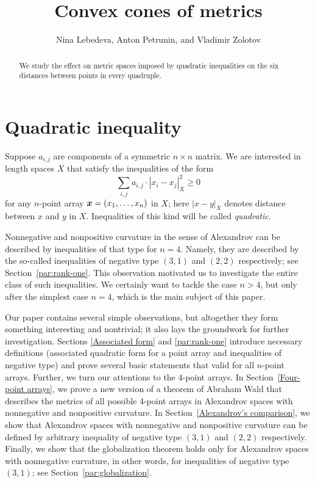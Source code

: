 \documentclass[a4paper,10pt]{article}
\def\thetitle{Convex cones of metrics}
\def\theauthors{Nina Lebedeva, Anton Petrunin, and Vladimir Zolotov}
\begin{document}


\title{\thetitle}
\author{\theauthors}
\date{}
\maketitle

\begin{abstract}
We study the effect on metric spaces imposed by quadratic inequalities on the six distances between points in every quadruple.
\end{abstract}

\section{Quadratic inequality}\label{par:quadratic-inq}

Suppose $a_{i,j}$ are components of a symmetric $n{\times}n$ matrix.
We are interested in length spaces $X$ that
satisfy the inequalities of the form
\[\sum_{i,j}a_{i,j}\cdot|x_i-x_j|_X^2\ge 0\]
for any $n$-point array $\bm{x}\z=(x_1,\dots,x_n)$ in $X$;
here $|x-y|_X$ denotes distance between $x$ and $y$ in $X$.
Inequalities of this kind will be called \emph{quadratic}.

Nonnegative and nonpositive curvature in the sense of Alexandrov can be described by inequalities of that type for $n=4$.
Namely, they are described by the so-called inequalities of negative type $(3,1)$ and $(2,2)$ respectively; see Section~\ref{par:rank-one}.
This observation motivated us to investigate the entire class of such inequalities.
We certainly want to tackle the case $n>4$, but only after the simplest case $n=4$, which is the main subject of this paper.

Our paper contains several simple observations, but altogether they form something interesting and nontrivial; it also lays the groundwork for further investigation.
Sections \ref{Associated form} and \ref{par:rank-one} introduce necessary definitions (associated quadratic form for a point array and inequalities of negative type) and prove several basic statements that valid for all $n$-point arrays.
Further, we turn our attentions to the $4$-point arrays.
In Section~\ref{Four-point arrays}, we prove a new version of a theorem of Abraham Wald \cite[§ 7]{wald} that describes
the metrics of all possible 4-point arrays in Alexandrov spaces with nonnegative and nonpositive curvature.
In Section~\ref{Alexandrov's comparison}, we show that Alexandrov spaces with nonnegative and nonpositive curvature can be defined by arbitrary inequality of negative type $(3,1)$ and $(2,2)$ respectively.
Finally, we show that the globalization theorem holds only for Alexandrov spaces with nonnegative curvature, in other words, for inequalities of negative type $(3,1)$;
see Section~\ref{par:globalization}.
\end{document}
